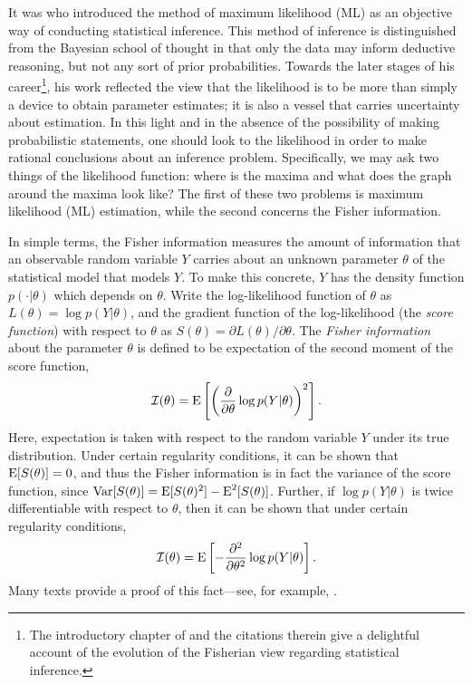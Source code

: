 It was \citet{ra1922mathematical} who introduced the method of maximum likelihood (ML) as an objective way of conducting statistical inference.
This method of inference is distinguished from the Bayesian school of thought in that only the data may inform deductive reasoning, but not any sort of  prior probabilities.
Towards the later stages of his career\footnote{The introductory chapter of \citet{pawitan2001all} and the citations therein give a delightful  account of the evolution of the Fisherian view regarding statistical inference.}, his work reflected the view that the likelihood is to be more than simply a device to obtain parameter estimates; it is also a vessel that carries uncertainty about estimation.
In this light and in the absence of the possibility of making probabilistic statements, one should look to the likelihood in order to make rational conclusions about an inference problem.
Specifically, we may ask two things of the likelihood function: where is the maxima and what does the graph around the maxima look like?
The first of these two problems is maximum likelihood (ML) estimation, while the second concerns the Fisher information.

In simple terms, the Fisher information measures the amount of information that an observable random variable $Y$ carries about an unknown parameter $\theta$ of the statistical model that models $Y$.
To make this concrete, $Y$ has the density function $p(\cdot|\theta)$ which depends on $\theta$.
Write the log-likelihood function of $\theta$ as $L(\theta) = \log p(Y|\theta)$, and the gradient function of the log-likelihood (the \emph{score function}) with respect to $\theta$ as $S(\theta) = \partial L(\theta)/\partial\theta$.
The \emph{Fisher information} about the parameter $\theta$ is defined to be expectation of the second moment of the score function, 
\[
  {\mathcal I}(\theta) = \operatorname{E}\left[\left(\frac{\partial}{\partial\theta} \log p(Y|\theta)\right)^2\right].
\]
Here, expectation is taken with respect to the random variable $Y$ under its true distribution.
Under certain regularity conditions, it can be shown that $\operatorname{E}[S(\theta)] = 0$, and thus the Fisher information is in fact the variance of the score function, since $\operatorname{Var}[S(\theta)] = \operatorname{E}[S(\theta)^2] - \operatorname{E}^2[S(\theta)]$.
Further, if $\log p(Y|\theta)$ is twice differentiable with respect to $\theta$, then it can be shown that under certain regularity conditions,
\[
  {\mathcal I}(\theta) = \operatorname{E}\left[-\frac{\partial ^ 2}{\partial\theta^2} \log p(Y|\theta)\right].
\]
Many texts provide a proof of this fact---see, for example, \citet[Sec. 9.7]{wasserman2013all}.

